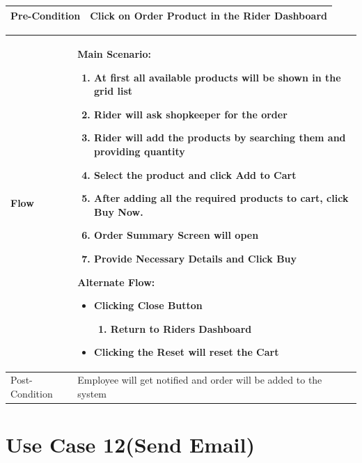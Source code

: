 \documentclass[12pt,a4paper]{report}
\begin{document}
\begin{tabular}{ | m{3cm} | m{12cm}| }
Pre-Condition &  Click on Order Product in the Rider Dashboard \\ \hline

\end{tabular} \newpage \begin{tabular}{ | m{3cm} | m{12cm}| }  \hline
Flow & Main Scenario:

\begin{enumerate}
\item   At first all available products will be shown in the grid list
\item  Rider will ask shopkeeper for the order
\item  Rider will add the products by searching them and providing quantity
\item  Select the product and click Add to Cart
\item  After adding all the required products to cart, click Buy Now.
\item  Order Summary Screen will open
\item  Provide Necessary Details and Click Buy 


\end{enumerate}

Alternate Flow:

\begin{itemize}
\item 	Clicking Close Button
	\begin{enumerate}
		\item 	Return to Riders Dashboard
	\end{enumerate}
\item Clicking the Reset will reset the Cart
	
\end{itemize}
\\ \hline
Post-Condition &  Employee will get notified and order will be added to the system  \\ \hline

\end{tabular}
\section{Use Case 12(Send Email) }
\end{document}

